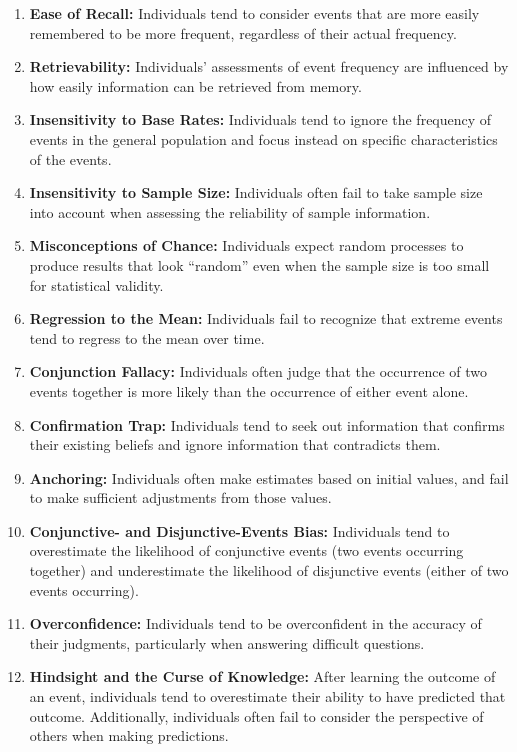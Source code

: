 \documentclass[
  12pt,
  oneside]{book}
\theoremstyle{definition}
\theoremstyle{definition}
\theoremstyle{definition}
\theoremstyle{definition}
\theoremstyle{remark}
\begin{document}
\begin{enumerate}
\def\labelenumi{\arabic{enumi}.}
\item
  \textbf{Ease of Recall:} Individuals tend to consider events that are more easily remembered to be more frequent, regardless of their actual frequency.
\item
  \textbf{Retrievability:} Individuals' assessments of event frequency are influenced by how easily information can be retrieved from memory.
\item
  \textbf{Insensitivity to Base Rates:} Individuals tend to ignore the frequency of events in the general population and focus instead on specific characteristics of the events.
\item
  \textbf{Insensitivity to Sample Size:} Individuals often fail to take sample size into account when assessing the reliability of sample information.
\item
  \textbf{Misconceptions of Chance:} Individuals expect random processes to produce results that look ``random'' even when the sample size is too small for statistical validity.
\item
  \textbf{Regression to the Mean:} Individuals fail to recognize that extreme events tend to regress to the mean over time.
\item
  \textbf{Conjunction Fallacy:} Individuals often judge that the occurrence of two events together is more likely than the occurrence of either event alone.
\item
  \textbf{Confirmation Trap:} Individuals tend to seek out information that confirms their existing beliefs and ignore information that contradicts them.
\item
  \textbf{Anchoring:} Individuals often make estimates based on initial values, and fail to make sufficient adjustments from those values.
\item
  \textbf{Conjunctive- and Disjunctive-Events Bias:} Individuals tend to overestimate the likelihood of conjunctive events (two events occurring together) and underestimate the likelihood of disjunctive events (either of two events occurring).
\item
  \textbf{Overconfidence:} Individuals tend to be overconfident in the accuracy of their judgments, particularly when answering difficult questions.
\item
  \textbf{Hindsight and the Curse of Knowledge:} After learning the outcome of an event, individuals tend to overestimate their ability to have predicted that outcome. Additionally, individuals often fail to consider the perspective of others when making predictions.
\end{enumerate}
\end{document}

